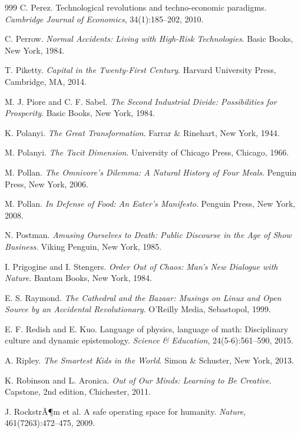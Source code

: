 \documentclass[11pt]{article}
\begin{document}
\begin{thebibliography}{999}
C. Perez.
Technological revolutions and techno-economic paradigms.
\textit{Cambridge Journal of Economics}, 34(1):185--202, 2010.

C. Perrow.
\textit{Normal Accidents: Living with High-Risk Technologies}.
Basic Books, New York, 1984.

T. Piketty.
\textit{Capital in the Twenty-First Century}.
Harvard University Press, Cambridge, MA, 2014.

M. J. Piore and C. F. Sabel.
\textit{The Second Industrial Divide: Possibilities for Prosperity}.
Basic Books, New York, 1984.

K. Polanyi.
\textit{The Great Transformation}.
Farrar \& Rinehart, New York, 1944.

M. Polanyi.
\textit{The Tacit Dimension}.
University of Chicago Press, Chicago, 1966.

M. Pollan.
\textit{The Omnivore's Dilemma: A Natural History of Four Meals}.
Penguin Press, New York, 2006.

M. Pollan.
\textit{In Defense of Food: An Eater's Manifesto}.
Penguin Press, New York, 2008.

N. Postman.
\textit{Amusing Ourselves to Death: Public Discourse in the Age of Show Business}.
Viking Penguin, New York, 1985.

I. Prigogine and I. Stengers.
\textit{Order Out of Chaos: Man's New Dialogue with Nature}.
Bantam Books, New York, 1984.

E. S. Raymond.
\textit{The Cathedral and the Bazaar: Musings on Linux and Open Source by an Accidental Revolutionary}.
O'Reilly Media, Sebastopol, 1999.

E. F. Redish and E. Kuo.
Language of physics, language of math: Disciplinary culture and dynamic epistemology.
\textit{Science \& Education}, 24(5-6):561--590, 2015.

A. Ripley.
\textit{The Smartest Kids in the World}.
Simon \& Schuster, New York, 2013.

K. Robinson and L. Aronica.
\textit{Out of Our Minds: Learning to Be Creative}.
Capstone, 2nd edition, Chichester, 2011.

J. RockstrÃ¶m et al.
A safe operating space for humanity.
\textit{Nature}, 461(7263):472--475, 2009.


\end{thebibliography}
\end{document}
